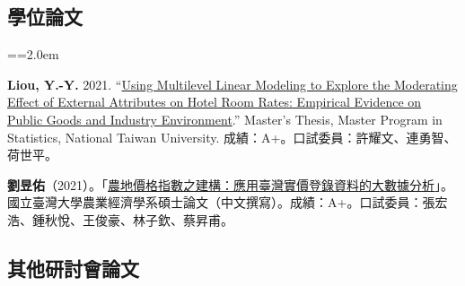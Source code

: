 \documentclass[11pt,letterpaper]{article}
\newenvironment{hanglist}{\par\setlength{\parindent}{0pt}\everypar={\hangindent=2.0em\hangafter=1}}{\par}
\begin{document}
\subsection{\texorpdfstring{\textbf{學位論文}}{學位論文}}\label{ux5b78ux4f4dux8ad6ux6587}

\begin{hanglist}

\textbf{Liou, Y.-Y.} 2021.
``\href{https://doi.org/10.6342/NTU202102085}{Using Multilevel Linear
Modeling to Explore the Moderating Effect of External Attributes on
Hotel Room Rates: Empirical Evidence on Public Goods and Industry
Environment}.'' Master's Thesis, Master Program in Statistics, National
Taiwan University. \newline 成績：A+。口試委員：許耀文、連勇智、荷世平。

\textbf{劉昱佑}（2021）。「\href{https://doi.org/10.6342/NTU202101981}{農地價格指數之建構：應用臺灣實價登錄資料的大數據分析}」。國立臺灣大學農業經濟學系碩士論文（中文撰寫）。\newline 成績：A+。口試委員：張宏浩、鍾秋悅、王俊豪、林子欽、蔡昇甫。

\end{hanglist}

\subsection{\texorpdfstring{\textbf{其他研討會論文}}{其他研討會論文}}\label{ux5176ux4ed6ux7814ux8a0eux6703ux8ad6ux6587}
\end{document}
